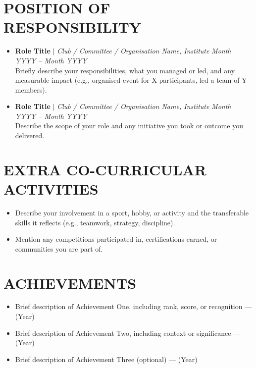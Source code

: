 \documentclass[a4paper,10pt]{article}
\begin{document}
\section{POSITION OF RESPONSIBILITY}

\begin{itemize}
    \item \textbf{Role Title} $|$ \textit{Club / Committee / Organisation Name, Institute} \hfill \textit{Month YYYY -- Month YYYY}\\
    Briefly describe your responsibilities, what you managed or led, and any measurable impact (e.g., organised event for X participants, led a team of Y members).

    \vspace{3pt}

    \item \textbf{Role Title} $|$ \textit{Club / Committee / Organisation Name, Institute} \hfill \textit{Month YYYY -- Month YYYY}\\
    Describe the scope of your role and any initiative you took or outcome you delivered.
\end{itemize}

\section{EXTRA CO-CURRICULAR ACTIVITIES}

\begin{itemize}
    \item Describe your involvement in a sport, hobby, or activity and the transferable skills it reflects (e.g., teamwork, strategy, discipline).
    \item Mention any competitions participated in, certifications earned, or communities you are part of.
\end{itemize}

\section{ACHIEVEMENTS}

\begin{itemize}
    \item Brief description of Achievement One, including rank, score, or recognition --- (Year)
    \item Brief description of Achievement Two, including context or significance --- (Year)
    \item Brief description of Achievement Three (optional) --- (Year)
\end{itemize}
\end{document}

